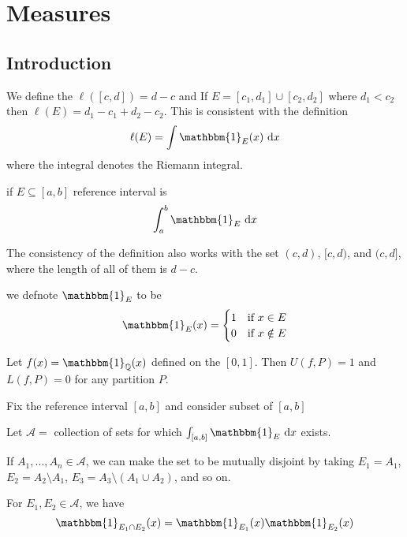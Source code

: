 \chapter{Measures}
\section{Introduction}

We define the $\ell([c, d]) = d-c$ and If $E = [c_1, d_1] \cup[c_2, d_2]$ 
where $d_1 < c_2$ then $\ell(E) = d_1 - c_1 + d_2 - c_2$.
This is consistent with the definition
\[\ell(E) = \int \mathbbm{1}_E(x) \ \mathrm{d}x\]
where the integral denotes the Riemann integral.

if $E \subseteq[a, b]$ reference interval is 
\[\int_a^b \mathbbm{1}_E\ \mathrm{d}x\]

\begin{remark}
  The consistency of the definition also works with the set $(c, d)$, $[c, d)$, and $(c, d]$, 
  where the length of all of them is $d-c$.
\end{remark}

\begin{remark}
  we defnote $\mathbbm{1}_E$ to be 
  \[
    \mathbbm{1}_E(x) = 
  \begin{cases}
    1 & \text{if } x \in E\\
    0 & \text{if } x \notin E 
  \end{cases}
  \]
\end{remark}

\begin{example}
  Let $f(x) = \mathbbm{1}_{\QQ}(x)$ defined on the $[0, 1]$. 
  Then $U(f, P) = 1$ and $L(f, P) = 0$ for any partition $P$. 
\end{example}



Fix the reference interval $[a, b]$ and consider subset of $[a, b]$

Let $\mathcal{A}=$ collection of sets for which $\int_{[a, b]} \mathbbm{1}_E\ \mathrm{d}x$ exists.

If $A_1, \dotsc, A_n \in \mathcal{A}$, we can make the set to be mutually disjoint by taking 
$E_1 = A_1$, $E_2 = A_2 \setminus A_1$, $E_3 = A_3 \setminus (A_1 \cup A_2)$, and so on.

\begin{example}
  For $E_1, E_2 \in \mathcal{A}$, we have
  \[\mathbbm{1}_{E_1 \cap E_2}(x) = \mathbbm{1}_{E_1}(x)\mathbbm{1}_{E_2}(x)\]
\end{example}

